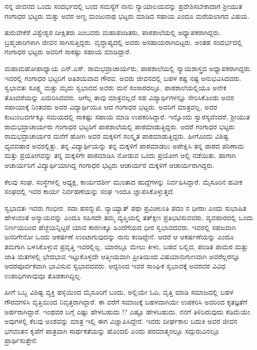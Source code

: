 {ನನ್ನ ಜೀವನದ ಒಂದು ಸಂದರ್ಭದಲ್ಲಿ  ಬಂದ ಸಮಸ್ಯೆಗೆ ನಾನು ನ್ಯಾಯಾಲಯವನ್ನು ಪ್ರವೇಶಿಸಬೇಕಾದಾಗ ಶ್ರೀಯುತ ಗಂಗಾಧರ ಭಟ್ಟರು ಮತ್ತು ಅವರ ಅಣ್ಣ ಮಂಜುನಾಥ ಭಟ್ಟರು ಮಾಡಿದ ಸಹಾಯ ಎಂದೂ ಮರೆಯಲಾಗದ ವಿಷಯ.

ತುರುವೇಕೆರೆ ವಿಶ್ವೇಶ್ವರ ದೀಕ್ಷಿತರು ಎಂಬವರು ಮಹಾಪಂಡಿತರು, ಪಾಠಶಾಲೆಯಲ್ಲಿ ಅಧ್ಯಾಪಕರಾಗಿದ್ದರು. ಬ್ರಹ್ಮಚಾರಿಗಳಾಗಿ ಜೀವನ ಸಾಗಿಸುತ್ತಿದ್ದರು. ವೃದ್ಧಾಪ್ಯದಲ್ಲಿ ಅವರು ಅಸಹಾಯರಾಗಿಬಿಟ್ಟರು. ಅಂತಹ ಸಂದರ್ಭದಲ್ಲಿ ಗಂಗಾಧರ ಭಟ್ಟರು ಅವರಿಗೆ ಸಾಕಷ್ಟು ಸಹಾಯ ಮಾಡಿದ್ದಾರೆ. 

ಮಹಾಮಹೋಪಾಧ್ಯಾಯ ಎನ್.ಎಸ್. ರಾಮಭದ್ರಾಚಾರ್ಯರು, ಪಾಠಶಾಲೆಯಲ್ಲಿ ನ್ಯಾಯಶಾಸ್ತ್ರದ ಅಧ್ಯಾಪಕರಾಗಿದ್ದರು. ಇವರಲ್ಲಿ ಗಂಗಾಧರ ಭಟ್ಟರಿಗೆ ಅತಿಶಯವಾದ ಗೌರವ. ಅವರು ಜೀವನದಲ್ಲಿ ಬಹಳ ಕಷ್ಟ   \enginline{-}   ನಷ್ಟ ಅನುಭವಿಸಿದವರು. ಸ್ವಭಾವತಃ ಸೂಕ್ಷ್ಮ ಮತ್ತು ಮೃದು ಸ್ವಭಾವದ ಅವರು ಮನೆ  \enginline{-}  ಸಂಸಾರದಲ್ಲೂ, ಪಾಠಶಾಲೆಯಲ್ಲಿಯೂ ಅನೇಕ ತೊಂದರೆಯನ್ನು ಎದುರಿಸಿದವರು. ಆಗೆಲ್ಲ ತಾವು ಮಾತ್ರವಲ್ಲದೆ ಸಹ ವಿದ್ಯಾರ್ಥಿಗಳನ್ನೂ ಸೇರಿಸಿಕೊಂಡು ಅವರ ಸಹಾಯಾಕ್ಕೆ ನಿಂತವರು ಅವರ ವಿದ್ಯಾರ್ಥಿಯೂ ಆದ ಗಂಗಾಧರ ಭಟ್ಟರು. ಅವರಿಗೆ ಮಾತ್ರವಲ್ಲ, ಅವರ  ಕುಟುಂಬವರ್ಗಕ್ಕೂ ಸಮಯದಲ್ಲಿ ಸಾಕಷ್ಟು ಸಹಾಯ ಮಾಡಿ ಉಪಕರಿಸಿದ್ದಾರೆ. ಇನ್ನೊಂದು ಸ್ವಾರಸ್ಯವೆಂದರೆ, ಶ್ರೀಯುತ ರಾಮಭದ್ರಾಚಾರ್ಯರು ಗಂಗಾಧರ ಭಟ್ಟರಿಗೆ ಪಾಠಶಾಲೆಯಲ್ಲಿ ಪಾಠಮಾಡುತ್ತಿದ್ದರು. ಆದರೆ ಗಂಗಾಧರ ಭಟ್ಟರು ರಾಮಭದ್ರಾಚಾರ್ಯರ  ಮನೆಗೆ ಹೋಗಿ ಅವರ ಮಕ್ಕಳಿಗೆ ಸಂಸ್ಕೃತ ಪಾಠಮಾಡುತ್ತಿದ್ದರು. ಹೀಗೊಂದು ವಿಶಿಷ್ಟ ವ್ಯವವಹಾರ ಅವರಲ್ಲಿತ್ತು. ತನ್ನ ವಿದ್ಯಾರ್ಥಿಯನ್ನು ತನ್ನ ಮಕ್ಕಳಿಗೆ ಪಾಠಮಾಡಲು ಅಪೇಕ್ಷಿಸಿ ತನ್ನ ಪಾಠದ ಪರಿಣಾಮ ಮತ್ತು ಪ್ರಯೋಗವನ್ನು ತನ್ನ ಮಕ್ಕಳಿಗೇ ಪಾಠಮಾಡಿಸಿ ನೋಡುವ ಒಂದು ಪ್ರಯೋಗ ಅಲ್ಲಿ ನಡೆಯಿತು.  ಹಾಗಾಗಿ ಆಚಾರ್ಯರಿಗೆ ವಿದ್ಯಾರ್ಥಿಯಾಗಿದ್ದ ಗಂಗಾಧರ ಭಟ್ಟರು  ಆಚಾರ್ಯರ ಮಕ್ಕಳಿಗೆ ಆಚಾರ್ಯರಾಗಿದ್ದರು.

ಕೆಲವು ಸಂಘ, ಸಂಸ್ಥೆಗಳಲ್ಲಿ ಅಧ್ಯಕ್ಷ, ಕಾರ್ಯದರ್ಶೀ ಮುಂತಾದ ಹುದ್ದೆಗಳನ್ನು ನಿರ್ವಹಿಸಿದ್ದಾರೆ. ಮೈಸೂರಿನ ಹವೀಕ ಸಂಘದಲ್ಲಿ ಇವರ ಕಾರ್ಯ ನಿರ್ವಹಣೆಯನ್ನು ಸಂಘ ಇಂದೂ ಜ್ಞಾಪಸಿಕೊಳ್ಳುತ್ತದೆ. 

ಸ್ವಭಾವತಃ ಇವರು ಗಂಭೀರ. ಸದಾ ಹಸನ್ಮುಖಿ. ನ್ಯಾಯ್ಯಾತ್ ಪಥಃ ಪ್ರವಿಚಲಂತಿ ಪದಂ ನ ಧೀರಾಃ ಎಂದು ಸುಭಾಷಿತ ಹೇಳುವಂತೆ ಅನ್ಯಾಯವನ್ನು ಎಂದೂ ಸಹಿಸದೇ ತಮ್ಮ ವ್ಯಪ್ತಿಯಲ್ಲಿ ತತ್ಕ್ಷಣ ಪ್ರತಿಭಟಿಸುವವರು. ವ್ಯವಹಾರದಲ್ಲಿ ಒಂದು  ನಿರ್ಣಯದಿಂದ ಹೆಜ್ಜೆಯನ್ನಿಟ್ಟರೆ ಯಾವ ಕಾರಣಕ್ಕೂ ಹಿಂದೆಗೆಯದ ಧೀರ ಸ್ವಭಾವದವರು. ಇವರಲ್ಲಿ ಸಹಜವಾಗಿ ಜನರಿಗೇನೋ ಒಂದು ಆಕರ್ಷಣೆ ಉಂಟಾಗುವುದನ್ನು ನಾನು ಕಂಡಿದ್ದೇನೆ. ಆದರೆ ಆ ಆಕರ್ಷಣೆಯನ್ನು ಎಂದೂ ತಮಗಾಗಿ ಬಳಸಿಕೊಳ್ಳುವ ಪ್ರವೃತ್ತಿ ಇವರಲ್ಲಿಲ್ಲ.  ಯಾರಲ್ಲೂ ಮೇಲು  \enginline{-}  ಕೀಳು, ಬಡವ  \enginline{-}  ಬಲ್ಲಿದ, ಪಂಡಿತ  \enginline{-}  ಪಾಮರ ಮತ್ತು ಜಾತಿ  \enginline{-}  ಮತಗಳಲ್ಲಿ ಭೇದಭಾವ ಇಟ್ಟುಕೊಳ್ಳದೇ ಆತ್ಮೀಯವಾಗಿ ಪ್ರೀತಿಯಿಂದ ವಿಷಯಾನುಗುಣವಾಗಿ ಅವರೆಲ್ಲರನ್ನೂ ಆದರಪೂರ್ವಕವಾಗಿ ಭಾವಿಸುವ ಸ್ವಭಾವದವರು. ಆದ್ದರಿಂದ ಇವರ ಸಾಂಘಿಕ ಸ್ವಭಾವಕ್ಕೆ ಅವರವರ ವಿವಿಧ ಉಪಾಧಿಗಳಾವುವೂ  ತೊಡಕಾಗಿದ್ದಿಲ್ಲ.

ಹೀಗೆ ಒಬ್ಬ ವಿಶಿಷ್ಟ ವ್ಯಕ್ತಿ ಹಳ್ಳಿಯಿಂದ ಮೈಸೂರಿಗೆ ಬಂದು, ಅಲ್ಲಿಯೇ ಓದಿ, ವೃತ್ತಿ ಮಾಡಿ ಸಮಾಜದಲ್ಲಿ ಬಹಳ ಗೌರವಗಳಿಸಿ ವೃತ್ತಿಯಿಂದ ನಿವೃತ್ತರಾಗಿದ್ದಾರೆ. ಈ ವರೆಗೆ ಸಮಾಜಕ್ಕೆ ಬಹಳವಾಗಿಯೇ ಉಪಕರಿಸಿ ಅವರಿಂದ ಕೃತಜ್ಞತೆಗೆ ಅರ್ಹರಾಗಿದ್ದಾರೆ. ಇಂಥವರ ಬಗ್ಗೆ ಎಷ್ಟು ಹೇಳಬಹುದು !? ಎಷ್ಟೂ ಹೇಳಬಹುದು. ನನಗೆ ತಿಳಿದಿರುವುದು ಕಡಿಮೆಯೇ. ಅವುಗಳಲ್ಲಿ ಕೆಲವು ಅಂಶವನ್ನು ಮಾತ್ರ ಇಲ್ಲಿ ಈಗ ವಿಜ್ಞಾಪಿಸಿದ್ದೇನೆ. ಇವರು ದೀರ್ಘಕಾಲ ಬದುಕಿ ಅವರ ಜೀವನ ಭಗವಂತನ ಕೃಪೆಗೆ ಪಾತ್ರವಾಗಿ ಸಾರ್ಥಕತೆಯನ್ನು ಹೊಂದಲಿ ಎಂದು ಪರಮಾತ್ಮನಲ್ಲೂ ಸದ್ಗುರುವಿನಲ್ಲೂ ಪ್ರಾರ್ಥಿಸುತ್ತೇನೆ.

\articleend
}
